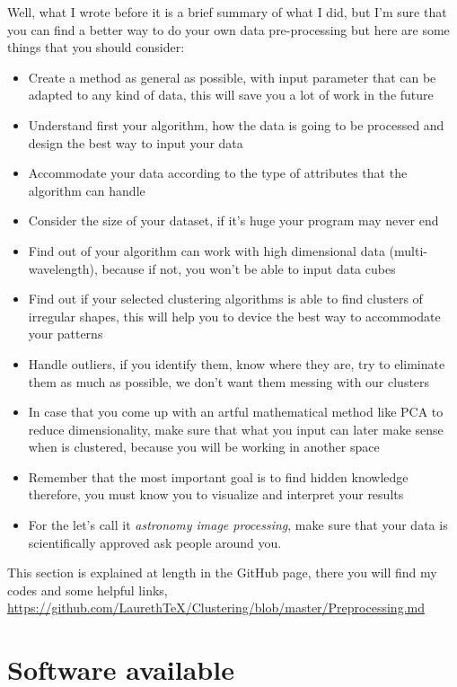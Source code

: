 \documentclass[11pt,fleqn]{book} %
\begin{document}
Well, what I wrote before it is a brief summary of what I did, but I'm sure that you can find a better way to do your own data pre-processing but here are some things that you should consider:
	\begin{itemize}
    	\item Create a method as general as possible, with input parameter that can be adapted to any kind of data, this will save you a lot of work in the future
        \item Understand first your algorithm, how the data is going to be processed and design the best way to input your data
        \item Accommodate your data according to the type of attributes that the algorithm can handle
        \item Consider the size of your dataset, if it's huge your program may never end
        \item Find out of your algorithm can work with high dimensional data (multi-wavelength), because if not, you won't be able to input data cubes
        \item Find out if your selected clustering algorithms is able to find clusters of irregular shapes, this will help you to device the best way to accommodate your patterns
        \item Handle outliers, if you identify them, know where they are, try to eliminate them as much as possible, we don't want them messing with our clusters
        \item In case that you come up with an artful mathematical method like PCA to reduce dimensionality, make sure that what you input can later make sense when is clustered, because you will be working in another space
        \item Remember that the most important goal is to find hidden knowledge therefore, you must know you to visualize and interpret your results
        \item For the let's call it \emph{astronomy image processing}, make sure that your data is scientifically approved ask people around you.
    \end{itemize}

This section is explained at length in the GitHub page, there you will find my codes and some helpful links, \url{https://github.com/LaurethTeX/Clustering/blob/master/Preprocessing.md}

\section{Software available}
\end{document}
